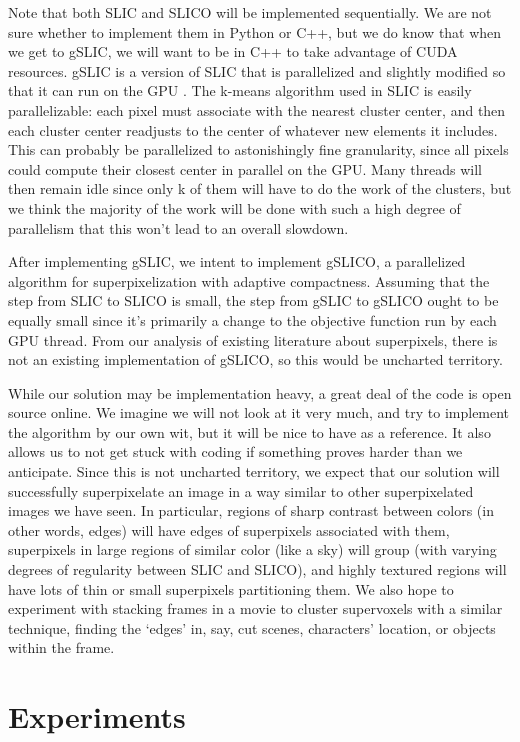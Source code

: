 \documentclass[11pt]{article}
\begin{document}
Note that both SLIC and SLICO will be implemented sequentially. We are not sure whether to implement them in Python or C++, but we do know that when we get to gSLIC, we will want to be in C++ to take advantage of CUDA resources. gSLIC is a version of SLIC that is parallelized and slightly modified so that it can run on the GPU \cite{gslic}. The k-means algorithm used in SLIC is easily parallelizable: each pixel must associate with the nearest cluster center, and then each cluster center readjusts to the center of whatever new elements it includes. This can probably be parallelized to astonishingly fine granularity, since all pixels could compute their closest center in parallel on the GPU. Many threads will then remain idle since only k of them will have to do the work of the clusters, but we think the majority of the work will be done with such a high degree of parallelism that this won't lead to an overall slowdown.

After implementing gSLIC, we intent to implement gSLICO, a parallelized algorithm for superpixelization with adaptive compactness. Assuming that the step from SLIC to SLICO is small, the step from gSLIC to gSLICO ought to be equally small since it's primarily a change to the objective function run by each GPU thread. From our analysis of existing literature about superpixels, there is not an existing implementation of gSLICO, so this would be uncharted territory.

While our solution may be implementation heavy, a great deal of the code is open source online. We imagine we will not look at it very much, and try to implement the algorithm by our own wit, but it will be nice to have as a reference. It also allows us to not get stuck with coding if something proves harder than we anticipate. Since this is not uncharted territory, we expect that our solution will successfully superpixelate an image in a way similar to other superpixelated images we have seen. In particular, regions of sharp contrast between colors (in other words, edges) will have edges of superpixels associated with them, superpixels in large regions of similar color (like a sky) will group (with varying degrees of regularity between SLIC and SLICO), and highly textured regions will have lots of thin or small superpixels partitioning them. We also hope to experiment with stacking frames in a movie to cluster supervoxels with a similar technique, finding the `edges' in, say, cut scenes, characters' location, or objects within the frame.

\section {Experiments}\label{exper}
\end{document}
